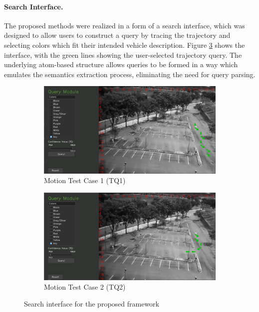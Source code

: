 \documentclass[runningheads]{llncs}
\begin{document}
\paragraph{Search Interface.} The proposed methods were realized in a form of a search interface, which was designed to allow users to construct a query by tracing the trajectory and selecting colors which fit their intended vehicle description. Figure \ref{fig:gui} shows the interface, with the green lines showing the user-selected trajectory query. The underlying atom-based structure allows queries to be formed in a way which emulates the semantics extraction process, eliminating the need for query parsing.
\begin{figure}[t!]
\centering
\begin{subfigure}{0.48\textwidth}
\includegraphics[width=\linewidth]{Images/test1-8inputs.PNG}
\caption{Motion Test Case 1 (TQ1)} \label{fig:test1}
\end{subfigure}
\begin{subfigure}{0.48\textwidth}
\includegraphics[width=\linewidth]{Images/test2-6input.PNG}
\caption{Motion Test Case 2 (TQ2)} \label{fig:test2}
\end{subfigure}
\vspace{-0.5em}
\caption{Search interface for the proposed framework} \label{fig:gui}
\vspace{-1em}
\end{figure}
\end{document}
